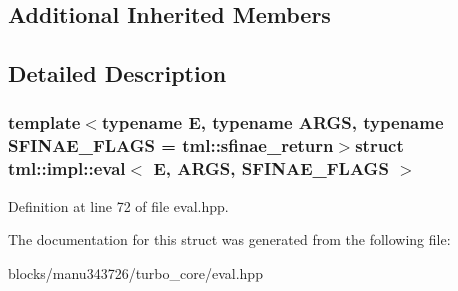 \subsection*{Additional Inherited Members}


\subsection{Detailed Description}
\subsubsection*{template$<$typename E, typename A\+R\+G\+S, typename S\+F\+I\+N\+A\+E\+\_\+\+F\+L\+A\+G\+S = tml\+::sfinae\+\_\+return$>$struct tml\+::impl\+::eval$<$ E, A\+R\+G\+S, S\+F\+I\+N\+A\+E\+\_\+\+F\+L\+A\+G\+S $>$}



Definition at line 72 of file eval.\+hpp.



The documentation for this struct was generated from the following file\+:\begin{DoxyCompactItemize}
\item 
blocks/manu343726/turbo\+\_\+core/eval.\+hpp\end{DoxyCompactItemize}
